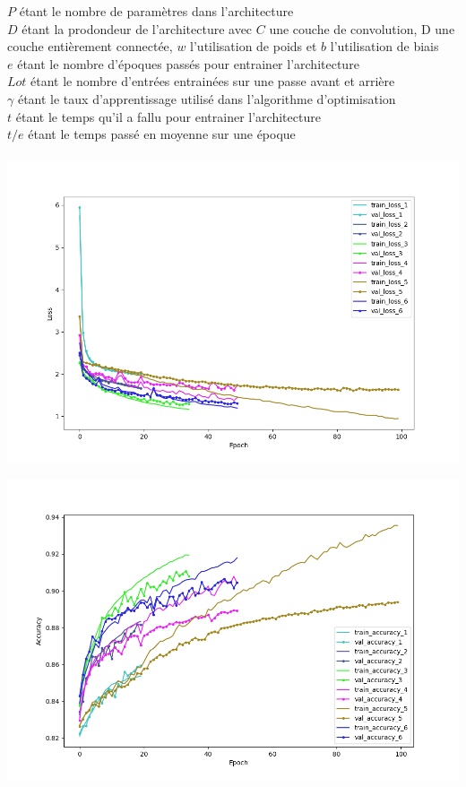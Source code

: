 \begin{multicols}{2}
{\scriptsize
$P$ étant le nombre de paramètres dans l'architecture\\

$D$ étant la prodondeur de l'architecture avec $C$ une couche de convolution, D une couche entièrement connectée, $w$ l'utilisation de poids et $b$ l'utilisation de biais \\

$e$ étant le nombre d'époques passés pour entrainer l'architecture \\

$Lot$ étant le nombre d'entrées entrainées sur une passe avant et arrière \\

$\gamma$ étant le taux d'apprentissage utilisé dans l'algorithme d'optimisation \\

$t$ étant le temps qu'il a fallu pour entrainer l'architecture \\

$t/e$ étant le temps passé en moyenne sur une époque \\
} \\

\includegraphics[width=\columnwidth]{images/cifar_10_losses.png}
\hfill\break

\includegraphics[width=\columnwidth]{images/cifar_10_accuracies.png}
\hfill\break


\end{multicols}

